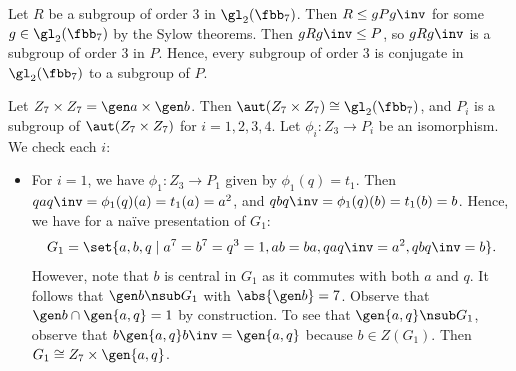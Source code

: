 \begin{solenum}
    Let $R$ be a subgroup of order 3 in $\gl_2(\fbb_7)$.
	Then $R \leq gPg\inv$ for some $g \in \gl_2(\fbb_7)$ by the Sylow theorems.
	Then $gRg\inv \leq P$, so $gRg\inv$ is a subgroup of order 3 in $P$.
	Hence, every subgroup of order 3 is conjugate in $\gl_2(\fbb_7)$ to a subgroup of $P$.
    \item Let $Z_7 \times Z_7 = \gen a \times \gen b$.
	Then $\aut(Z_7 \times Z_7) \cong \gl_2(\fbb_7)$, and $P_i$ is a subgroup of $\aut(Z_7 \times Z_7)$ for $i = 1, 2, 3, 4$.
	Let $\phi_i \colon Z_3 \to P_i$ be an isomorphism.
	We check each $i$:
    \begin{itemize}
        \item For $i = 1$, we have $\phi_1 \colon Z_3 \to P_1$ given by $\phi_1(q) = t_1$.
	    Then $qaq\inv = \phi_1(q)(a) = t_1(a) = a^2$, and $qbq\inv = \phi_1(q)(b) = t_1(b) = b$.
	    Hence, we have for a na\"ive presentation of $G_1$:
        \[
        	G_1 = \set{a, b, q \mid a^7 = b^7 = q^3 = 1, ab = ba, qaq\inv = a^2, qbq\inv = b}.
        \]
        However, note that $b$ is central in $G_1$ as it commutes with both $a$ and $q$.
        It follows that $\gen b \nsub G_1$ with $\abs{\gen b} = 7$.
        Observe that $\gen b \cap \gen{a, q} = 1$ by construction.
        To see that $\gen{a, q} \nsub G_1$, observe that $b\gen{a, q}b\inv = \gen{a, q}$ because $b \in Z(G_1)$.
        Then $G_1 \cong Z_7 \times \gen{a, q}$.


\end{itemize}
\end{solenum}
